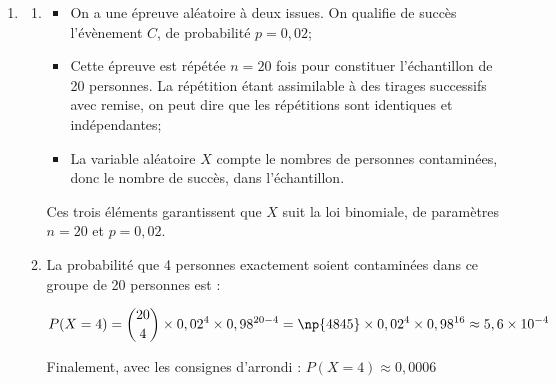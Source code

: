 \begin{enumerate}
\begin{enumerate}
Cette affirmation est \textbf{vraie}, car on a calculé qu'environ 1,38~\% des personnes vaccinées ont été contaminées par le virus, donc, par complémentaire, cela implique qu'environ 98,62~\% des personnes vaccinées n'ont pas été contaminées. Il est donc correct de dire que c'est plus de 98~\%.
	\end{enumerate}
\item
	\begin{enumerate}
		\item 
\begin{itemize}
\item On a une épreuve aléatoire à deux issues. On qualifie de succès l'évènement $C$, de probabilité $p = 0,02$;
\item Cette épreuve est répétée $n =20$ fois pour constituer l'échantillon de 20 personnes. La répétition étant assimilable à des tirages successifs avec remise, on peut dire que les répétitions sont identiques et indépendantes;
\item La variable aléatoire $X$ compte le nombres de personnes contaminées, donc le nombre de succès, dans l'échantillon.
\end{itemize}

Ces trois éléments garantissent que $X$ suit la loi binomiale, de paramètres $n = 20$ et $p = 0,02$.

		\item La probabilité que 4 personnes exactement soient contaminées dans ce groupe de 20 personnes est :

			$P(X = 4) = \displaystyle \binom{20}{4}\times 0,02^4 \times 0,98^{20 - 4} = \np{4845}\times 0,02^4 \times 0,98^{16} \approx 5,6\times 10^{-4}$

Finalement, avec les consignes d'arrondi : \quad $P(X = 4) \approx 0,0006$
	\end{enumerate}
\end{enumerate}

\medskip
